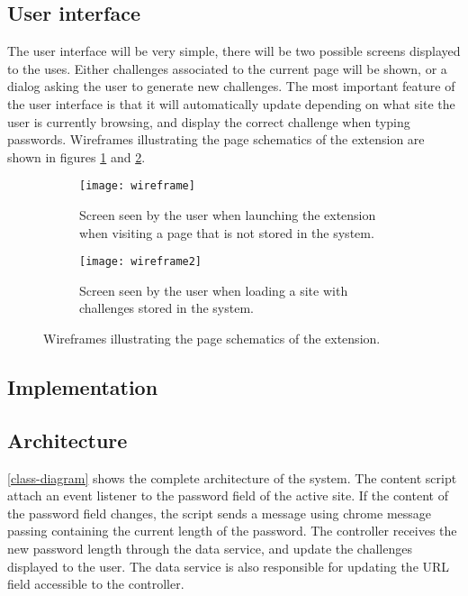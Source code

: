 \subsection{User interface}
The user interface will be very simple, there will be two possible screens displayed to the uses. Either challenges associated to the current page will be shown, or a dialog asking the user to generate new challenges. The most important feature of the user interface is that it will automatically update depending on what site the user is currently browsing, and display the correct challenge when typing passwords. Wireframes illustrating the page schematics of the extension are shown in figures \ref{add-new-screen} and \ref{challenge-screen}.

\begin{figure}[h]
    \centering
    \begin{subfigure}[t]{0.49\textwidth}
        \centering
        \texttt{[image: wireframe]} 
        \caption{Screen seen by the user when launching the extension when visiting a page that is not stored in the system.}
        \label{add-new-screen}
    \end{subfigure}
    \hfill
    \begin{subfigure}[t]{0.49\textwidth}
        \centering
        \texttt{[image: wireframe2]} 
        \caption{Screen seen by the user when loading a site with challenges stored in the system. }
        \label{challenge-screen}
    \end{subfigure}
    \caption{Wireframes illustrating the page schematics of the extension.}
    \label{wireframes}
\end{figure}

\subsection{Implementation}

\subsection{Architecture}
\par \autoref{class-diagram} shows the complete architecture of the system.
 The content script attach an event listener to the password field of the active site. If the content of the password field changes, the script sends a message using chrome message passing containing the current length of the password. The controller receives the new password length through the data service, and update the challenges displayed to the user. The data service is also responsible for updating the URL field accessible to the controller.

